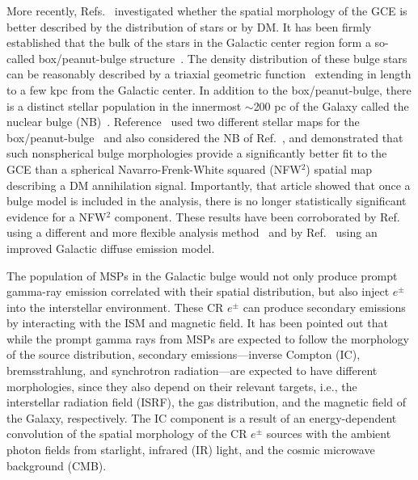 \documentclass[doublespace,nopageskip]{VTthesis} %
\begin{document}
More recently, Refs.~\cite{2018NatAs...2..387M, 2018NatAs...2..819B,  2019JCAP...09..042M} investigated whether the spatial morphology of the GCE is better described by the distribution of stars or by DM. It has been firmly established that the bulk of the stars in the Galactic center region form a so-called box/peanut-bulge structure~\cite{1995ApJ...445..716D,1998ApJ...492..495F,2000MNRAS.313..392L,2010ApJ...721L..28N,2013MNRAS.435.1874W}. The density distribution of these bulge stars can be reasonably described by a triaxial geometric function~\cite{1998ApJ...492..495F,2010ApJ...721L..28N,2013MNRAS.435.1874W} extending in length to a few kpc from the Galactic center. In addition to the box/peanut-bulge, there is a distinct stellar population in the innermost $\sim$200 pc of the Galaxy called the nuclear bulge (NB)~\cite{2013ApJ...769L..28N}. Reference~\cite{2018NatAs...2..387M} used two different stellar maps for the box/peanut-bulge~\cite{1998ApJ...492..495F,2016AJ....152...14N} and also considered the NB of Ref.~\cite{2013ApJ...769L..28N}, and demonstrated that such nonspherical bulge morphologies provide a significantly better fit to the GCE than a spherical Navarro-Frenk-White squared (NFW$^2$) spatial map describing a DM annihilation signal. Importantly, that article showed that once a bulge model is included in the analysis, there is no longer statistically significant evidence for a NFW$^2$ component. These results have been corroborated by Ref.\cite{2018NatAs...2..819B} using a different and more flexible analysis method~\cite{2017JCAP...08..022S} and by Ref.~\cite{2019JCAP...09..042M} using an improved Galactic diffuse emission model.

The population of MSPs in the Galactic bulge would not only produce prompt gamma-ray emission correlated with their spatial distribution, but also inject $e^\pm$ into the interstellar environment. These CR $e^\pm$ can produce secondary emissions by interacting with the ISM and magnetic field. It has been pointed out that while the prompt gamma rays from MSPs are expected to follow the morphology of the source distribution, secondary emissions---inverse Compton (IC), bremsstrahlung, and synchrotron radiation---are expected to have different morphologies, since they also depend on their relevant targets, i.e., the interstellar radiation field (ISRF), the gas distribution, and the magnetic field of the Galaxy, respectively. The IC component is a result of an energy-dependent convolution of the spatial morphology of the CR $e^\pm$ sources with the ambient photon fields from starlight, infrared (IR) light, and the cosmic microwave background (CMB).
\end{document}

